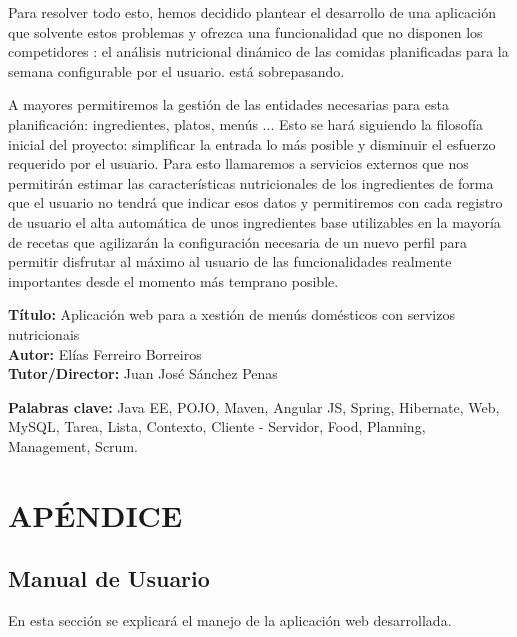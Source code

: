\documentclass[12pt, a4paper, twoside]{book}
\begin{document}
	Para resolver todo esto, hemos decidido plantear el desarrollo de una aplicación que solvente estos problemas y ofrezca una funcionalidad que no disponen los competidores : el análisis nutricional dinámico de las comidas planificadas para la semana configurable por el usuario. está sobrepasando.
	
	A mayores permitiremos la gestión de las entidades necesarias para esta planificación: ingredientes, platos, menús ... 
	Esto se hará siguiendo la filosofía inicial del proyecto: simplificar la entrada lo más posible y disminuir el esfuerzo requerido por el usuario. 
	Para esto llamaremos a servicios externos que nos permitirán estimar las características nutricionales de los ingredientes de forma que el usuario no tendrá que indicar esos datos y permitiremos con cada registro de usuario el alta automática de unos ingredientes base utilizables en la mayoría de recetas que agilizarán la configuración necesaria de un nuevo perfil para permitir disfrutar al máximo al usuario de las funcionalidades realmente importantes desde el momento más temprano posible.
	
	\clearpage
	
	\textbf{Título:} Aplicación web para a xestión de menús domésticos con servizos nutricionais
	\\
	\textbf{Autor:} Elías Ferreiro Borreiros
	\\
	\textbf{Tutor/Director:} Juan José Sánchez Penas
	
	
	\textbf{Palabras clave:} Java EE, POJO, Maven, Angular JS, Spring, Hibernate, Web, MySQL, Tarea, Lista, Contexto, Cliente - Servidor, Food, Planning, Management, Scrum. 
	
	
	\renewcommand{\contentsname}{Índice de contenidos}
	\renewcommand{\listfigurename}{Índice de figuras}
	\renewcommand{\listtablename}{Índice de tablas}
	
	\tableofcontents %
	
	\listoffigures %
	
	\listoftables %
	
	\clearpage
	
	\chapter{APÉNDICE}
	\section{Manual de Usuario}
	\raggedbottom
	En esta sección se explicará el manejo de la aplicación web desarrollada.
\end{document}
